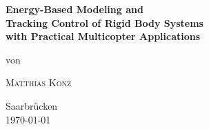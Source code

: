 \begin{titlepage}

\begin{center}

  \vspace*{1cm}

  \LARGE{\bf Energy-Based Modeling and\\ Tracking Control of Rigid Body Systems\\ with Practical Multicopter Applications} \\[1.5cm]
  
  \vfill

  \vspace{8mm}
  
  {\normalsize von} \\

  \vspace{8mm}
  
  {\LARGE\scshape Matthias Konz} \\
  
  \vfill

  {\large Saarbrücken} \\

  {\large \today}
  
\end{center}

\end{titlepage}